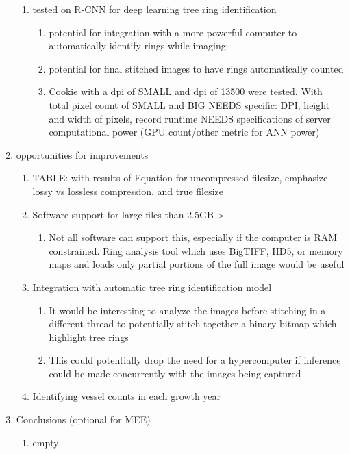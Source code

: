 \documentclass{article}
\begin{document}
\begin{outline}[enumerate]
\begin{enumerate}
\begin{enumerate}
		\item tested on R-CNN for deep learning tree ring identification
			\begin{enumerate}
			\item potential for integration with a more powerful computer to automatically identify rings while imaging
			\item potential for final stitched images to have rings automatically counted
			\item Cookie with a dpi of SMALL and dpi of 13500 were tested. With total pixel count of SMALL and BIG
				\subitem NEEDS specific: DPI, height and width of pixels, record runtime
				\subitem NEEDS specifications of server computational power (GPU count/other metric for ANN power)
			\end{enumerate}
		\end{enumerate}
	\item opportunities for improvements %
		\begin{enumerate}
		\item TABLE: with results of Equation for uncompressed filesize, emphasize lossy vs lossless compression, and true filesize %
		\item Software support for large files than 2.5GB >
			\begin{enumerate}
			\item Not all software can support this, especially if the computer is RAM constrained. Ring analysis tool which uses BigTIFF, HD5, or memory maps and loads only partial portions of the full image would be useful
			\end{enumerate}
		\item Integration with automatic tree ring identification model
			\begin{enumerate}
			\item It would be interesting to analyze the images before stitching in a different thread to potentially stitch together a binary bitmap which highlight tree rings
			\item This could potentially drop the need for a hypercomputer if inference could be made concurrently with the images being captured
			\end{enumerate}
		\item Identifying vessel counts in each growth year 
		\end{enumerate}
\item Conclusions (optional for MEE) %
	\begin{enumerate}
	\item empty
	\end{enumerate}

\end{enumerate}
\end{outline}
\end{document}
